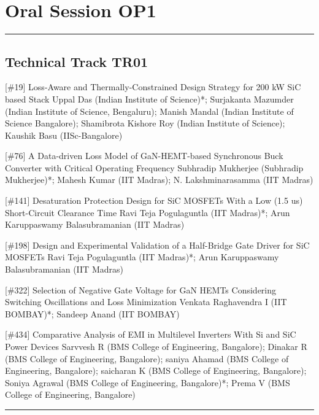 \section{Oral Session OP1}\nopagebreak
\hrule
\subsection{Technical Track TR01}\nopagebreak{} \begin{abstract_online} {[\#19] Loss-Aware and Thermally-Constrained Design Strategy for 200 kW SiC based Stack} {} {Uppal Das (Indian Institute of Science)*; Surjakanta Mazumder (Indian Institute of Science, Bengaluru); Manish Mandal (Indian Institute of Science Bangalore); Shamibrota Kishore Roy (Indian Institute of Science); Kaushik Basu (IISc-Bangalore)} {}  \end{abstract_online} 
{} \begin{abstract_online} {[\#76] A Data-driven Loss Model of GaN-HEMT-based  Synchronous Buck Converter with Critical  Operating Frequency} {} {Subhradip Mukherjee (Subhradip Mukherjee)*; Mahesh Kumar (IIT Madras); N. Lakshminarasamma (IIT Madras)} {}  \end{abstract_online} 
{} \begin{abstract_online} {[\#141] Desaturation Protection Design for SiC MOSFETs With a Low (1.5 us) Short-Circuit Clearance Time} {} {Ravi Teja Pogulaguntla (IIT Madras)*; Arun Karuppaswamy Balasubramanian (IIT Madras)} {}  \end{abstract_online} 
{} \begin{abstract_online} {[\#198] Design and Experimental Validation of a Half-Bridge Gate Driver for SiC MOSFETs} {} {Ravi Teja Pogulaguntla (IIT Madras)*; Arun Karuppaswamy Balasubramanian (IIT Madras)} {}  \end{abstract_online} 
{} \begin{abstract_online} {[\#322] Selection of Negative Gate Voltage for GaN HEMTs Considering  Switching Oscillations and Loss Minimization} {} {Venkata Raghavendra I (IIT BOMBAY)*; Sandeep Anand (IIT BOMBAY)} {}  \end{abstract_online} 
{} \begin{abstract_online} {[\#434] Comparative Analysis of EMI in Multilevel Inverters With Si and SiC Power Devices} {} {Sarvvesh R (BMS College of Engineering, Bangalore); Dinakar R (BMS College of Engineering, Bangalore); saniya Ahamad (BMS College of Engineering, Bangalore); saicharan K (BMS College of Engineering, Bangalore); Soniya  Agrawal (BMS College of Engineering, Bangalore)*; Prema V (BMS College of Engineering, Bangalore)} {}  \end{abstract_online} 
\hrule
